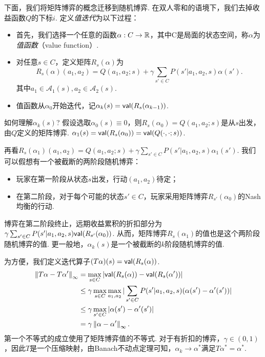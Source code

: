 下面，我们将矩阵博弈的概念迁移到随机博弈. 在双人零和的语境下，我们去掉收益函数$Q$的下标$i$. 定义\emph{值迭代}为以下过程：
\begin{itemize}
    \item 首先，我们选择一个任意的函数$\alpha: C\to \mathbb{R}$，其中C是局面的状态空间，称$\alpha$为\emph{值函数}（value function）.
    \item 对任意$s\in C$，定义矩阵$R_s(\alpha)$为
    \[R_s(\alpha)(a_1,a_2) = Q(a_1,a_2;s) + \gamma \sum_{s'\in C}P(s'|a_1,a_2,s)\alpha(s').\]
    其中$a_1\in \mathcal A_1(s), a_2\in \mathcal A_2(s)$.
    \item 值函数从$\alpha_0$开始迭代，记$\alpha_k(s)=\mathsf{val}(R_s(\alpha_{k-1}))$. 
\end{itemize}
如何理解$\alpha_k(s)$? 假设选取$\alpha_0(s)\equiv 0$，则$R_s(\alpha_0)=Q(a_1,a_2;s)$是从$s$出发，由$Q$定义的矩阵博弈. $\alpha_1(s)=\mathsf{val}(R_s(\alpha_0))=\mathsf{val}(Q(\cdot,\cdot;s))$.

再看$R_s(\alpha_1)(a_1,a_2)=Q(a_1,a_2;s)+\gamma\sum_{s'\in C}P(s'|a_1,a_2,s)\alpha_1(s')$. 我们可以假想有一个被截断的两阶段随机博弈：
        \begin{itemize}
            \item 玩家在第一阶段从状态$s$出发，行动$(a_1,a_2)$待定；\item 在第二阶段，对于每个可能的状态$s'\in C$，玩家采用矩阵博弈$R_{s'}(\alpha_0)$的Nash均衡的行动.
        \end{itemize} 
博弈在第二阶段终止，远期收益累积的折扣部分为$\gamma \sum_{s'\in C}P(s'|a_1,a_2,s)\mathsf{val}(R_{s'}(\alpha_0))$. 从而，矩阵博弈$R_s(\alpha_1)$的值也是这个两阶段随机博弈的值. 更一般地，$\alpha_{k}(s)$是一个被截断的$k$阶段随机博弈的值.

为方便，我们定义迭代算子$(T\alpha)(s) = \mathsf{val}(R_s(\alpha))$.
        \begin{align*}
            \left\|T\alpha-T\alpha'\right\|_\infty &= \max_{s\in C}|\mathsf{val} (R_s(\alpha)) - \mathsf{val}(R_s(\alpha'))| \\
            &\leq \gamma \max_{s\in C} \max_{a_1,a_2}|\sum_{s'\in C}P(s'|a_1,a_2,s)(\alpha(s') - \alpha'(s'))| \\
            &\leq \gamma \max_{s'\in C} |\alpha(s') - \alpha'(s')| \\
            &= \gamma \left\|\alpha-\alpha'\right\|_\infty.
        \end{align*}
第一个不等式的成立使用了矩阵博弈值的不等式. 对于有折扣的博弈，$\gamma\in (0,1)$，因此$T$是一个压缩映射，由Banach不动点定理可知，$\alpha_k\to \alpha^*$满足$T\alpha^*=\alpha^*$.

